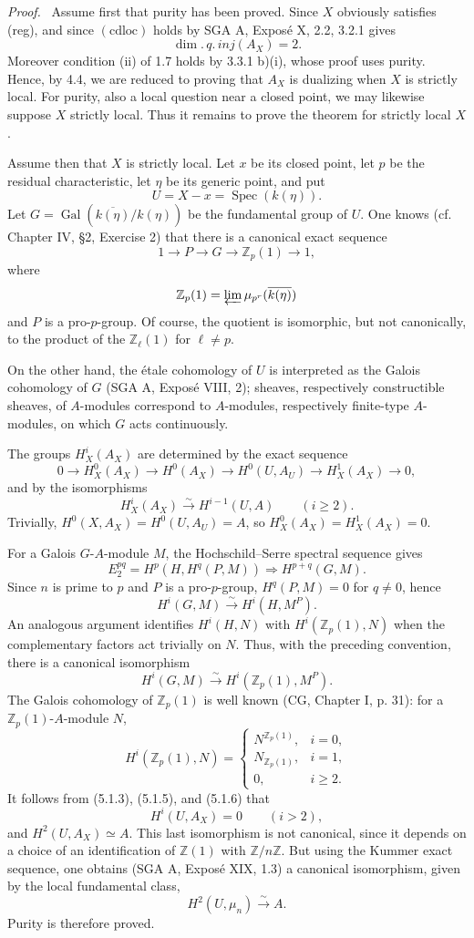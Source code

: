 \documentclass[12pt]{article}
\newcommand{\ZZ}{\mathbb Z}
\newcommand{\Spec}{\operatorname{Spec}}
\newcommand{\Gal}{\operatorname{Gal}}
\newenvironment{prooftext}[1][Proof]{\par\noindent\emph{#1.}\ }{\par\medskip}
\begin{document}
\begin{prooftext}
Assume first that purity has been proved. Since $X$ obviously satisfies (reg), and since $(\mathrm{cdloc})$ holds by SGA A, Exposé X, 2.2, 3.2.1 gives
\[
   \dim.\,q.\,inj(A_X)=2.
\]
Moreover condition (ii) of 1.7 holds by 3.3.1 b)(i), whose proof uses purity. Hence, by 4.4, we are reduced to proving that $A_X$ is dualizing when $X$ is strictly local. For purity, also a local question near a closed point, we may likewise suppose $X$ strictly local. Thus it remains to prove the theorem for strictly local $X$.

Assume then that $X$ is strictly local. Let $x$ be its closed point, let $p$ be the residual characteristic, let $\eta$ be its generic point, and put
\[
   U=X-x=\Spec(k(\eta)).
\]
Let $G=\Gal(\overline{k(\eta)}/k(\eta))$ be the fundamental group of $U$. One knows (cf. Chapter IV, §2, Exercise 2) that there is a canonical exact sequence
\[
   1\longrightarrow P\longrightarrow G\longrightarrow \ZZ_p(1)\longrightarrow1,\tag{5.1.1}
\]
where
\[
   \ZZ_p(1)=\varprojlim \mu_{p^r}(\overline{k(\eta)})
\]
and $P$ is a pro-$p$-group. Of course, the quotient is isomorphic, but not canonically, to the product of the $\ZZ_\ell(1)$ for $\ell\ne p$.

On the other hand, the étale cohomology of $U$ is interpreted as the Galois cohomology of $G$ (SGA A, Exposé VIII, 2); sheaves, respectively constructible sheaves, of $A$-modules correspond to $A$-modules, respectively finite-type $A$-modules, on which $G$ acts continuously.

The groups $H^i_X(A_X)$ are determined by the exact sequence
\[
0\to H^0_X(A_X)\to H^0(A_X)\to H^0(U,A_U)
\to H^1_X(A_X)\to0,\tag{5.1.2}
\]
and by the isomorphisms
\[
   H^i_X(A_X)\xrightarrow{\sim}H^{i-1}(U,A)
      \qquad(i\ge2).\tag{5.1.3}
\]
Trivially, $H^0(X,A_X)=H^0(U,A_U)=A$, so $H^0_X(A_X)=H^1_X(A_X)=0$.

For a Galois $G$-$A$-module $M$, the Hochschild--Serre spectral sequence gives
\[
   E_2^{pq}=H^p(H,H^q(P,M))\Rightarrow H^{p+q}(G,M).
\]
Since $n$ is prime to $p$ and $P$ is a pro-$p$-group, $H^q(P,M)=0$ for $q\ne0$, hence
\[
   H^i(G,M)\xrightarrow{\sim}H^i(H,M^P).\tag{5.1.4}
\]
An analogous argument identifies $H^i(H,N)$ with $H^i(\ZZ_p(1),N)$ when the complementary factors act trivially on $N$. Thus, with the preceding convention, there is a canonical isomorphism
\[
   H^i(G,M)\xrightarrow{\sim}H^i(\ZZ_p(1),M^P).\tag{5.1.5}
\]
The Galois cohomology of $\ZZ_p(1)$ is well known (CG, Chapter I, p. 31): for a $\ZZ_p(1)$-$A$-module $N$,
\[
H^i(\ZZ_p(1),N)=
\begin{cases}
N^{\ZZ_p(1)},& i=0,\\
N_{\ZZ_p(1)},& i=1,\\
0,& i\ge2.
\end{cases}\tag{5.1.6}
\]
It follows from (5.1.3), (5.1.5), and (5.1.6) that
\[
   H^i(U,A_X)=0\qquad(i>2),
\]
and $H^2(U,A_X)\simeq A$. This last isomorphism is not canonical, since it depends on a choice of an identification of $\ZZ(1)$ with $\ZZ/n\ZZ$. But using the Kummer exact sequence, one obtains (SGA A, Exposé XIX, 1.3) a canonical isomorphism, given by the local fundamental class,
\[
   H^2(U,\mu_n)\xrightarrow{\sim}A.\tag{5.1.7}
\]
Purity is therefore proved.


\end{prooftext}
\end{document}

